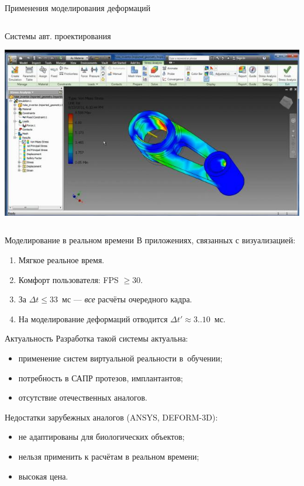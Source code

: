 \documentclass[usenames,dvipsnames,pdftex,unicode,hidelinks]{beamer}
\renewcommand{\le}{\leqslant} %
\renewcommand{\ge}{\geqslant} %
\begin{document}
\begin{frame}{Применения моделирования деформаций}
\begin{columns}[c]
\begin{column}{0.5\textwidth}
\begin{center}
          Системы авт. проектирования

          \includegraphics[height=0.3\textheight]{cad}
        \end{center}
      \end{column}
    \end{columns}
  \end{frame}
  \begin{frame}{Моделирование в реальном времени}
    В приложениях, связанных с визуализацией:
    \begin{enumerate}
      \item Мягкое реальное время.
      \item Комфорт пользователя: FPS $\ge 30$.
      \item За $\Delta t \le 33$~мс --- \emph{все} расчёты очередного кадра.
      \item На моделирование деформаций отводится $\Delta t' \approx 3..10$~мс.
    \end{enumerate}
  \end{frame}

  \begin{frame}{Актуальность}
    Разработка такой системы актуальна:
    \begin{itemize}
      \item применение систем виртуальной реальности в~обучении;
      \item потребность в САПР протезов, имплантантов;
      \item отсутствие отечественных аналогов.
    \end{itemize}

    \vspace{0.5cm}
    
    Недостатки зарубежных аналогов (ANSYS, DEFORM-3D):
    \begin{itemize}
      \item не адаптированы для биологических объектов;
      \item нельзя применить к расчётам в реальном времени;
      \item высокая цена.
    \end{itemize}
  \end{frame}
\end{document}
